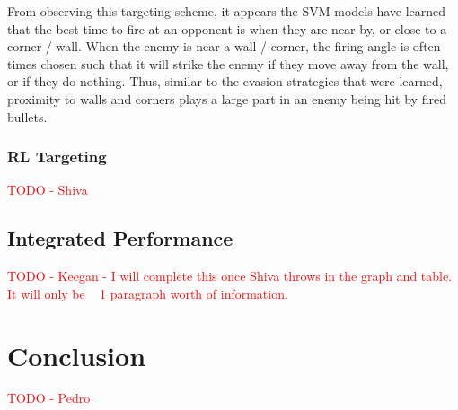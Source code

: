 \documentclass{article}
\newcommand{\xxx}[1]{\textcolor{red}{#1}}
\theoremstyle{plain}
\theoremstyle{definition}
\theoremstyle{remark}
\begin{document}
From observing this targeting scheme, it appears the SVM models have learned that the best time to fire at an opponent is when they are near by, or close to a corner / wall. When the enemy is near a wall / corner, the firing angle is often times chosen such that it will strike the enemy if they move away from the wall, or if they do nothing. Thus, similar to the evasion strategies that were learned, proximity to walls and corners plays a large part in an enemy being hit by fired bullets. 

\subsubsection*{RL Targeting}
\xxx{TODO - Shiva}

\subsection*{Integrated Performance}
\xxx{TODO - Keegan - I will complete this once Shiva throws in the graph and table. It will only be ~ 1 paragraph worth of information.}

\section{Conclusion}
\xxx{TODO - Pedro}




\end{document}
